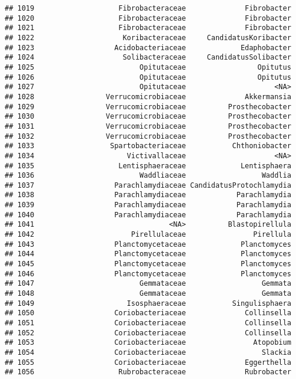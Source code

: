 \documentclass[
]{article}
\begin{document}
\begin{verbatim}
## 1019                    Fibrobacteraceae              Fibrobacter
## 1020                    Fibrobacteraceae              Fibrobacter
## 1021                    Fibrobacteraceae              Fibrobacter
## 1022                     Koribacteraceae     CandidatusKoribacter
## 1023                   Acidobacteriaceae             Edaphobacter
## 1024                     Solibacteraceae     CandidatusSolibacter
## 1025                         Opitutaceae                 Opitutus
## 1026                         Opitutaceae                 Opitutus
## 1027                         Opitutaceae                     <NA>
## 1028                 Verrucomicrobiaceae              Akkermansia
## 1029                 Verrucomicrobiaceae          Prosthecobacter
## 1030                 Verrucomicrobiaceae          Prosthecobacter
## 1031                 Verrucomicrobiaceae          Prosthecobacter
## 1032                 Verrucomicrobiaceae          Prosthecobacter
## 1033                  Spartobacteriaceae           Chthoniobacter
## 1034                      Victivallaceae                     <NA>
## 1035                    Lentisphaeraceae             Lentisphaera
## 1036                         Waddliaceae                  Waddlia
## 1037                   Parachlamydiaceae CandidatusProtochlamydia
## 1038                   Parachlamydiaceae            Parachlamydia
## 1039                   Parachlamydiaceae            Parachlamydia
## 1040                   Parachlamydiaceae            Parachlamydia
## 1041                                <NA>          Blastopirellula
## 1042                       Pirellulaceae                Pirellula
## 1043                   Planctomycetaceae             Planctomyces
## 1044                   Planctomycetaceae             Planctomyces
## 1045                   Planctomycetaceae             Planctomyces
## 1046                   Planctomycetaceae             Planctomyces
## 1047                         Gemmataceae                  Gemmata
## 1048                         Gemmataceae                  Gemmata
## 1049                      Isosphaeraceae           Singulisphaera
## 1050                   Coriobacteriaceae              Collinsella
## 1051                   Coriobacteriaceae              Collinsella
## 1052                   Coriobacteriaceae              Collinsella
## 1053                   Coriobacteriaceae                Atopobium
## 1054                   Coriobacteriaceae                  Slackia
## 1055                   Coriobacteriaceae              Eggerthella
## 1056                    Rubrobacteraceae              Rubrobacter

\end{verbatim}
\end{document}
